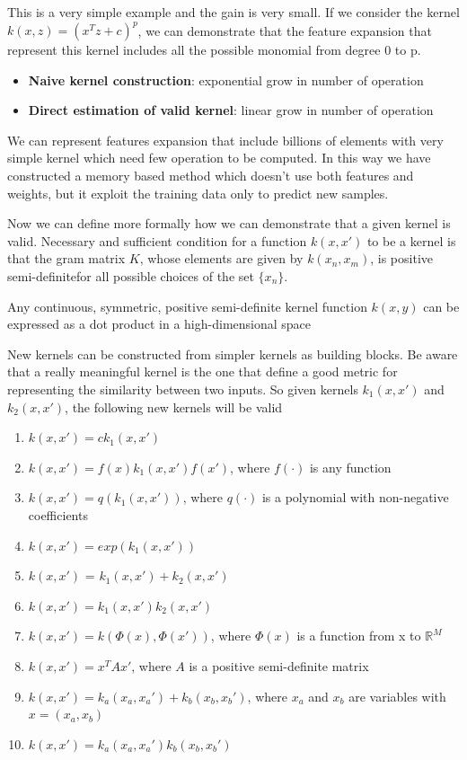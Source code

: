 \documentclass[../main.tex]{subfiles}
\begin{document}
This is a very simple example and the gain is very small. If we consider the kernel $k(x,z) = (x^T z + c)^p$, we can demonstrate that the feature expansion that represent this kernel includes all the possible monomial from degree 0 to p.
\begin{itemize}
    \item \textbf{Naive kernel construction}: exponential grow in number of operation
    \item \textbf{Direct estimation of valid kernel}: linear grow in number of operation
\end{itemize}
We can represent features expansion that include billions of elements with very simple kernel which need few operation to be computed.
In this way we have constructed a memory based method which doesn't use both features and weights, but it exploit the training data only to predict new samples.

Now we can define more formally how we can demonstrate that a given kernel is valid.
Necessary and sufficient condition for a function $k(x, x')$ to be a kernel is that the gram matrix $K$, whose elements are given by $k(x_n, x_m)$, is positive semi-definite\footnotemark for all possible choices of the set $\{x_n\}$.
\begin{theorem}
    Any continuous, symmetric, positive semi-definite kernel function $k(x, y)$ can be expressed as a dot product in a high-dimensional space
\end{theorem}
New kernels can be constructed from simpler kernels as building blocks.
Be aware that a really meaningful kernel is the one that define a good metric for representing the similarity between two inputs.
So given kernels $k_1(x,x')$ and $k_2(x,x')$, the following new kernels will be
valid
\begin{enumerate}
    \item $k(x,x') = ck_1(x,x')$
    \item $k(x,x') = f(x)k_1(x,x')f(x')$, where $f(\cdot)$ is any function
    \item $k(x,x') = q(k_1(x,x'))$, where $q(\cdot)$ is a polynomial with non-negative coefficients
    \item $k(x,x') = exp(k_1(x,x'))$
    \item $k(x,x')$ = $k_1(x,x')+k_2(x,x')$
    \item $k(x,x')=k_1(x,x')k_2(x,x')$
    \item $k(x,x')=k(\Phi(x),\Phi(x'))$, where $\Phi(x)$ is a function from x to $\mathbb{R}^M$
    \item $k(x,x') = x^TAx'$, where $A$ is a positive semi-definite matrix
    \item $k(x,x') = k_a(x_a,x_a') + k_b(x_b,x_b')$, where $x_a$ and $x_b$ are variables with $x=(x_a,x_b)$
    \item $k(x,x')=k_a(x_a,x_a') k_b(x_b,x_b')$
\end{enumerate}
\end{document}
